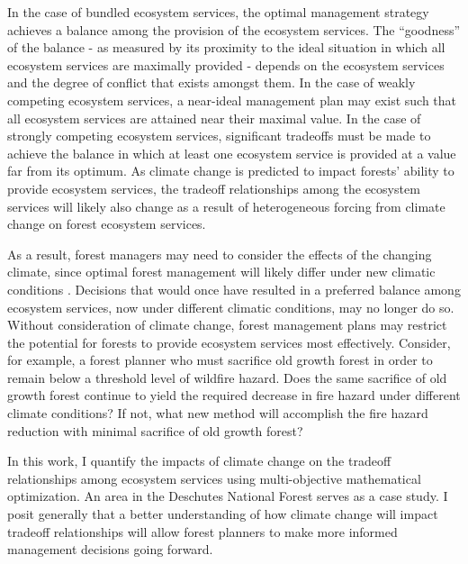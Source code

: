 In the case of bundled ecosystem services, the optimal management strategy achieves a balance among the provision of the ecosystem services. The ``goodness'' of the balance - as measured by its proximity to the ideal situation in which all ecosystem services are maximally provided - depends on the ecosystem services and the degree of conflict that exists amongst them. In the case of weakly competing ecosystem services, a near-ideal management plan may exist such that all ecosystem services are attained near their maximal value. In the case of strongly competing ecosystem services, significant tradeoffs must be made to achieve the balance in which at least one ecosystem service is provided at a value far from its optimum. As climate change is predicted to impact forests' ability to provide ecosystem services, the tradeoff relationships among the ecosystem services will likely also change as a result of heterogeneous forcing from climate change on forest ecosystem services.

As a result, forest managers may need to consider the effects of the changing climate, since %
optimal forest management will likely differ under new climatic conditions \cite{linder2000developing}. Decisions that would once have resulted in a preferred balance among ecosystem services, now under different climatic conditions, may no longer do so. Without consideration of climate change, forest management plans may restrict the potential for forests to provide ecosystem services most effectively. Consider, for example, a forest planner who must sacrifice old growth forest in order to remain below a threshold level of wildfire hazard. Does the same sacrifice of old growth forest continue to yield the required decrease in fire hazard under different climate conditions? If not, what new method will accomplish the fire hazard reduction with minimal sacrifice of old growth forest?

In this work, I quantify the impacts of climate change on the tradeoff relationships among ecosystem services using multi-objective mathematical optimization. An area in the Deschutes National Forest serves as a case study. I posit generally that a better understanding of how climate change will impact tradeoff relationships will allow forest planners to make more informed management decisions going forward.

